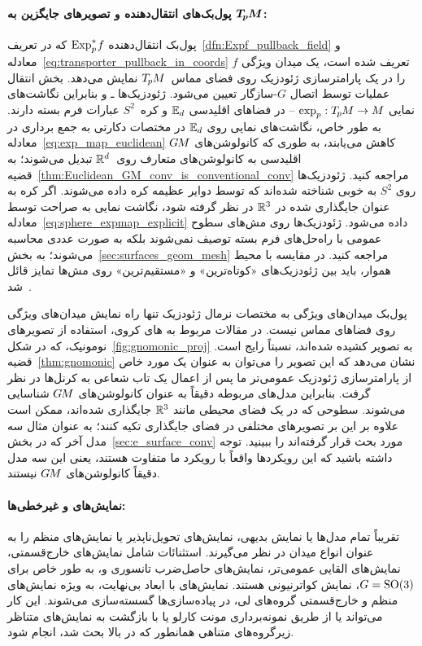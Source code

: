 \paragraph{پول‌بک‌های انتقال‌دهنده و تصویرهای جایگزین به $\boldsymbol{T_{\mkern-1.5mu p}\mkern-.5muM}$:}
پول‌بک انتقال‌دهنده $\operatorname{Exp}^*_p\mkern-2mu f$ که در تعریف~\ref{dfn:Expf_pullback_field} و معادله~\eqref{eq:transporter_pullback_in_coords} تعریف شده است، یک میدان ویژگی $f$ را در یک پارامترسازی ژئودزیک روی فضای مماس~$T_{\mkern-1.5mu p}\mkern-.5muM$ نمایش می‌دهد.
بخش انتقال عملیات توسط اتصال $G$-سازگار تعیین می‌شود.
ژئودزیک‌ها ـ و بنابراین نگاشت‌های نمایی $\exp_p: T_{\mkern-1.5mu p}\mkern-.5muM\to M$ -- در فضاهای اقلیدسی $\mathbb{E}_d$ و کره~$S^2$ عبارات فرم بسته دارند.
به طور خاص، نگاشت‌های نمایی روی $\mathbb{E}_d$ در مختصات دکارتی به جمع برداری در معادله~\eqref{eq:exp_map_euclidean} کاهش می‌یابند، به طوری که کانولوشن‌های $G\mkern-1.4muM$ اقلیدسی به کانولوشن‌های متعارف روی~$\mathbb{R}^d$ تبدیل می‌شوند؛ به قضیه~\ref{thm:Euclidean_GM_conv_is_conventional_conv} مراجعه کنید.
ژئودزیک‌ها روی $S^2$ به خوبی شناخته شده‌اند که توسط دوایر عظیمه کره داده می‌شوند.
اگر کره به عنوان جایگذاری شده در $\mathbb{R}^3$ در نظر گرفته شود، نگاشت نمایی به صراحت توسط معادله~\eqref{eq:sphere_expmap_explicit} داده می‌شود.
ژئودزیک‌ها روی مش‌های سطوح عمومی با راه‌حل‌های فرم بسته توصیف نمی‌شوند بلکه به صورت عددی محاسبه می‌شوند؛ به بخش~\ref{sec:surfaces_geom_mesh} مراجعه کنید.
در مقایسه با محیط هموار، باید بین ژئودزیک‌های «کوتاه‌ترین» و «مستقیم‌ترین» روی مش‌ها تمایز قائل شد~\cite{polthier1998straightest}.

پول‌بک میدان‌های ویژگی به مختصات نرمال ژئودزیک تنها راه نمایش میدان‌های ویژگی روی فضاهای مماس نیست.
در مقالات مربوط به \CNN های کروی، استفاده از تصویرهای نومونیک، که در شکل~\ref{fig:gnomonic_proj} به تصویر کشیده شده‌اند، نسبتاً رایج است.
قضیه~\ref{thm:gnomonic} نشان می‌دهد که این تصویر را می‌توان به عنوان یک مورد خاص از پارامترسازی ژئودزیک عمومی‌تر ما پس از اعمال یک تاب شعاعی به کرنل‌ها در نظر گرفت.
بنابراین مدل‌های مربوطه دقیقاً به عنوان کانولوشن‌های $G\mkern-1.4muM$ شناسایی می‌شوند.
سطوحی که در یک فضای محیطی مانند $\mathbb{R}^3$ جایگذاری شده‌اند، ممکن است علاوه بر این بر تصویرهای مختلفی در فضای جایگذاری تکیه کنند؛ به عنوان مثال سه مدل آخر که در بخش~\ref{sec:e_surface_conv} مورد بحث قرار گرفته‌اند را ببینید.
توجه داشته باشید که این رویکردها واقعاً با رویکرد ما متفاوت هستند، یعنی این سه مدل دقیقاً کانولوشن‌های $G\mkern-1.4muM$ نیستند.

\paragraph{نمایش‌های \textit{} و غیرخطی‌ها:}
تقریباً تمام مدل‌ها یا نمایش بدیهی، نمایش‌های تحویل‌ناپذیر یا نمایش‌های منظم را به عنوان انواع میدان در نظر می‌گیرند.
استثنائات شامل نمایش‌های خارج‌قسمتی، نمایش‌های القایی عمومی‌تر، نمایش‌های حاصل‌ضرب تانسوری و، به طور خاص برای $G=\operatorname{SO}(3)$، نمایش کواترنیونی هستند.
نمایش‌های با ابعاد بی‌نهایت، به ویژه نمایش‌های منظم و خارج‌قسمتی گروه‌های لی، در پیاده‌سازی‌ها گسسته‌سازی می‌شوند.
این کار می‌تواند یا از طریق نمونه‌برداری مونت کارلو یا با بازگشت به نمایش‌های متناظر زیرگروه‌های متناهی همانطور که در بالا بحث شد، انجام شود.

